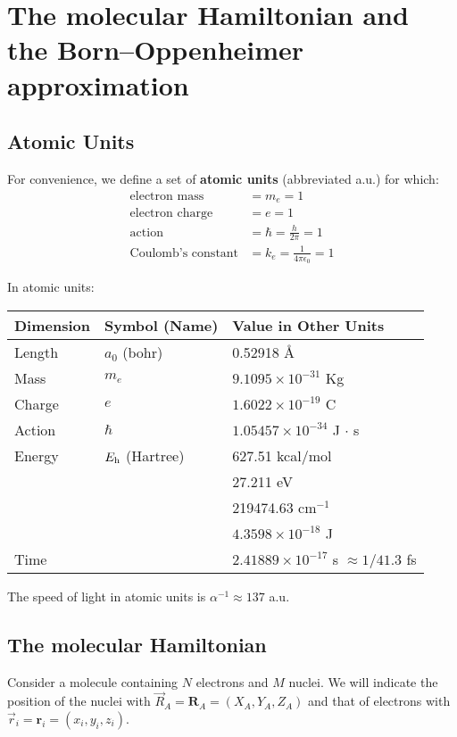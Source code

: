 \documentclass[../Main/chem532-notes.tex]{subfiles}
\begin{document}
\chapter[The molecular Hamiltonian]{The molecular Hamiltonian and the Born--Oppenheimer approximation}

\section{Atomic Units} 
For convenience, we define a set of \textbf{atomic units} (abbreviated a.u.) for which:
\begin{align}
\text{electron mass} & = m_e = 1\\
\text{electron charge} & = e = 1\\
\text{action} & = \hbar = \frac{h}{2\pi} = 1\\
\text{Coulomb's constant} & = k_e = \frac{1}{4\pi \epsilon_0} = 1
\end{align}

In atomic units:
\begin{table}[htbp]
\centering
\begin{tabular}{lll}
\toprule
Dimension & Symbol (Name) & Value in Other Units\\
\midrule
Length & $a_0$ (bohr) & 0.52918 \AA{} \\ 
Mass & $m_e$ & $9.1095 \times 10^{-31}$ Kg \\
Charge & $e$ & $1.6022 \times 10^{-19}$ C \\
Action & $\hbar$ & $1.05457 \times 10^{-34}$ J $\cdot$ s \\
Energy & $E_{\rm h}$ (Hartree) & 627.51 kcal/mol \\
& & 27.211 eV \\
& & 219474.63 cm$^{-1}$ \\
& & $4.3598 \times 10^{-18}$ J\\
Time & & $2.41889 \times 10^{-17}$ s $\approx 1/41.3$ fs\\
\bottomrule
\end{tabular}
\label{tab:atomicunits}
\end{table}

The speed of light in atomic units is $\alpha^{-1}\approx 137$ a.u.

\section{The molecular Hamiltonian}
Consider a molecule containing $N$ electrons and $M$ nuclei.
We will indicate the position of the nuclei with $\vec{R}_A = \mathbf{R}_A = (X_A,Y_A,Z_A)$ and that of electrons with $\vec{r}_i = \mathbf{r}_i = (x_i,y_i,z_i)$.
\end{document}
